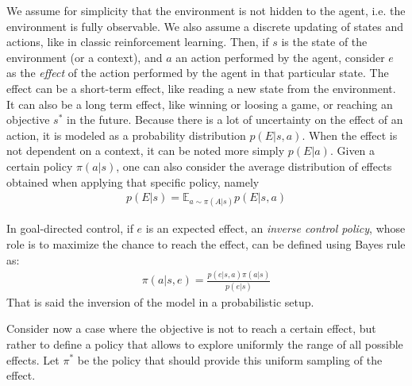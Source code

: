 \documentclass[runningheads]{llncs}
\begin{document}

We assume for simplicity that the environment is not hidden to the agent, i.e. the environment is fully observable. We also assume a discrete updating of states and actions, like in classic reinforcement learning.
Then, if $s$ is the state of the environment (or a context), and $a$ an action performed by the agent, consider $e$ as the \emph{effect} of the action performed by the agent in that particular state. The effect can be a short-term effect, like reading a new state from the environment. It can also be a long term effect, like winning or loosing a game, or reaching an objective $s^*$ in the future. Because there is a lot of uncertainty on the effect of an action, it is modeled as a probability distribution $p(E|s,a)$.
When the effect is not dependent on a context, it can be noted more simply $p(E|a)$.
Given a certain policy $\pi(a|s)$, one can also consider the average distribution of effects obtained when applying that specific policy, namely 
\begin{align}\label{eq:effect-model}
p(E|s) = \mathbb{E}_{a\sim \pi(A|s)} p(E|s,a)
\end{align}  

In goal-directed control, if $e$ is an expected effect, an \emph{inverse control policy}, whose role is to maximize the chance to reach the effect, can be defined using Bayes rule as:
\begin{align}\label{eq:inv-policy}
\pi(a|s,e) = \frac{p(e|s,a)\pi(a|s)}{p(e|s)}
\end{align}
That is said the inversion of the model in a probabilistic setup. 

Consider now a case where the objective is not to reach a certain effect, but rather to define a policy that allows to explore uniformly the range of all possible effects. Let $\pi^*$ be the policy that should provide this uniform sampling of the effect. 
\end{document}
